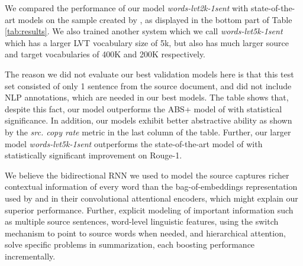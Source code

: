 \documentclass[11pt]{article}
\begin{document}
We compared the performance of our model {\it words-lvt2k-1sent} with state-of-the-art models on the sample created by , as displayed in the bottom part of Table \ref{tab:results}. We also trained another system which we call {\it words-lvt5k-1sent} which has a larger LVT vocabulary size of 5k, but also has much larger source and target vocabularies of 400K and 200K respectively.

The reason we did not evaluate our best validation models here is that this test set consisted of only 1 sentence from the source document, and did not include NLP annotations, which are needed in our best models. The table shows that, despite this fact, our model outperforms the ABS+ model of  with statistical significance. In addition, our models exhibit better abstractive ability as shown by the {\it src. copy rate} metric in the last column of the table. Further, our larger model {\it words-lvt5k-1sent} outperforms the state-of-the-art model of \cite{chopra} with statistically significant improvement on Rouge-1. 

We believe the bidirectional RNN we used to model the source captures richer contextual information of every word than the bag-of-embeddings representation used by  and  in their convolutional attentional encoders, which might explain our superior performance. Further, explicit modeling of important information such as multiple source sentences, word-level linguistic features, using the switch mechanism to point to source words when needed, and hierarchical attention, solve specific problems in summarization, each boosting performance incrementally. 
\end{document}
